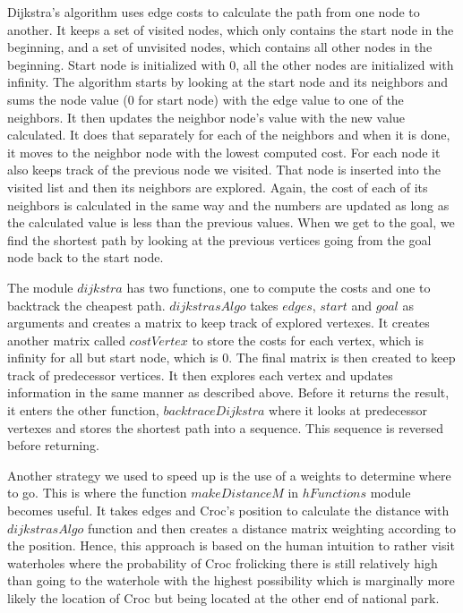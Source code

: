 \documentclass[a4paper]{article}
\begin{document}
Dijkstra's algorithm uses edge costs to calculate the path from one node to another. It keeps a set of visited nodes, which only contains the start node in the beginning, and a set of unvisited nodes, which contains all other nodes in the beginning. Start node is initialized with 0, all the other nodes are initialized with infinity. The algorithm starts by looking at the start node and its neighbors and sums the node value (0 for start node) with the edge value to one of the neighbors. It then updates the neighbor node's value with the new value calculated. It does that separately for each of the neighbors and when it is done, it moves to the neighbor node with the lowest computed cost. For each node it also keeps track of the previous node we visited. That node is inserted into the visited list and then its neighbors are explored. Again, the cost of each of its neighbors is calculated in the same way and the numbers are updated as long as the calculated value is less than the previous values. When we get to the goal, we find the shortest path by looking at the previous vertices going from the goal node back to the start node.

The module $dijkstra$ has two functions, one to compute the costs and one to backtrack the cheapest path. $dijkstrasAlgo$ takes $edges$, $start$ and $goal$ as arguments and creates a matrix to keep track of explored vertexes. It creates another matrix called $costVertex$ to store the costs for each vertex, which is infinity for all but start node, which is 0. The final matrix is then created to keep track of predecessor vertices. It then explores each vertex and updates information in the same manner as described above. Before it returns the result, it enters the other function, $backtraceDijkstra$ where it looks at predecessor vertexes and stores the shortest path into a sequence. This sequence is reversed before returning.

Another strategy we used to speed up is the use of a weights to determine where to go. This is where the function $makeDistanceM$ in $hFunctions$ module becomes useful. It takes edges and Croc's position to calculate the distance with $dijkstrasAlgo$ function and then creates a distance matrix weighting according to the position. Hence, this approach is based on the human intuition to rather visit waterholes where the probability of Croc frolicking there is still relatively high than going to the waterhole with the highest possibility which is marginally more likely the location of Croc but being located at the other end of national park.  
\end{document}
